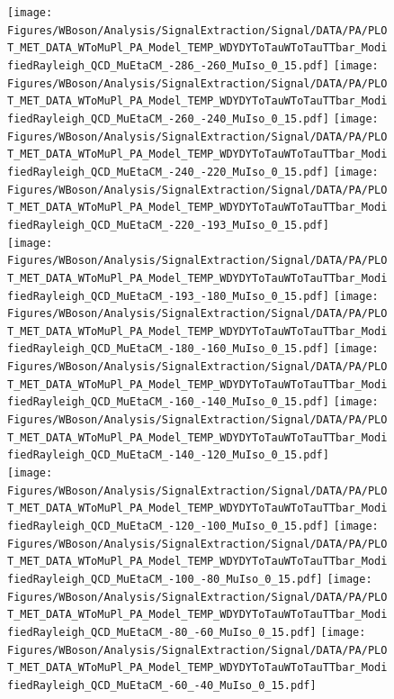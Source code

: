 \begin{figure}[!h]
\begin{center}
\begin{tiny}
\texttt{[image: Figures/WBoson/Analysis/SignalExtraction/Signal/DATA/PA/PLOT\_MET\_DATA\_WToMuPl\_PA\_Model\_TEMP\_WDYDYToTauWToTauTTbar\_ModifiedRayleigh\_QCD\_MuEtaCM\_-286\_-260\_MuIso\_0\_15.pdf]}
\texttt{[image: Figures/WBoson/Analysis/SignalExtraction/Signal/DATA/PA/PLOT\_MET\_DATA\_WToMuPl\_PA\_Model\_TEMP\_WDYDYToTauWToTauTTbar\_ModifiedRayleigh\_QCD\_MuEtaCM\_-260\_-240\_MuIso\_0\_15.pdf]}
\texttt{[image: Figures/WBoson/Analysis/SignalExtraction/Signal/DATA/PA/PLOT\_MET\_DATA\_WToMuPl\_PA\_Model\_TEMP\_WDYDYToTauWToTauTTbar\_ModifiedRayleigh\_QCD\_MuEtaCM\_-240\_-220\_MuIso\_0\_15.pdf]}
\texttt{[image: Figures/WBoson/Analysis/SignalExtraction/Signal/DATA/PA/PLOT\_MET\_DATA\_WToMuPl\_PA\_Model\_TEMP\_WDYDYToTauWToTauTTbar\_ModifiedRayleigh\_QCD\_MuEtaCM\_-220\_-193\_MuIso\_0\_15.pdf]}
\\
\texttt{[image: Figures/WBoson/Analysis/SignalExtraction/Signal/DATA/PA/PLOT\_MET\_DATA\_WToMuPl\_PA\_Model\_TEMP\_WDYDYToTauWToTauTTbar\_ModifiedRayleigh\_QCD\_MuEtaCM\_-193\_-180\_MuIso\_0\_15.pdf]}
\texttt{[image: Figures/WBoson/Analysis/SignalExtraction/Signal/DATA/PA/PLOT\_MET\_DATA\_WToMuPl\_PA\_Model\_TEMP\_WDYDYToTauWToTauTTbar\_ModifiedRayleigh\_QCD\_MuEtaCM\_-180\_-160\_MuIso\_0\_15.pdf]}
\texttt{[image: Figures/WBoson/Analysis/SignalExtraction/Signal/DATA/PA/PLOT\_MET\_DATA\_WToMuPl\_PA\_Model\_TEMP\_WDYDYToTauWToTauTTbar\_ModifiedRayleigh\_QCD\_MuEtaCM\_-160\_-140\_MuIso\_0\_15.pdf]}
\texttt{[image: Figures/WBoson/Analysis/SignalExtraction/Signal/DATA/PA/PLOT\_MET\_DATA\_WToMuPl\_PA\_Model\_TEMP\_WDYDYToTauWToTauTTbar\_ModifiedRayleigh\_QCD\_MuEtaCM\_-140\_-120\_MuIso\_0\_15.pdf]}
\\
\texttt{[image: Figures/WBoson/Analysis/SignalExtraction/Signal/DATA/PA/PLOT\_MET\_DATA\_WToMuPl\_PA\_Model\_TEMP\_WDYDYToTauWToTauTTbar\_ModifiedRayleigh\_QCD\_MuEtaCM\_-120\_-100\_MuIso\_0\_15.pdf]}
\texttt{[image: Figures/WBoson/Analysis/SignalExtraction/Signal/DATA/PA/PLOT\_MET\_DATA\_WToMuPl\_PA\_Model\_TEMP\_WDYDYToTauWToTauTTbar\_ModifiedRayleigh\_QCD\_MuEtaCM\_-100\_-80\_MuIso\_0\_15.pdf]}
\texttt{[image: Figures/WBoson/Analysis/SignalExtraction/Signal/DATA/PA/PLOT\_MET\_DATA\_WToMuPl\_PA\_Model\_TEMP\_WDYDYToTauWToTauTTbar\_ModifiedRayleigh\_QCD\_MuEtaCM\_-80\_-60\_MuIso\_0\_15.pdf]}
\texttt{[image: Figures/WBoson/Analysis/SignalExtraction/Signal/DATA/PA/PLOT\_MET\_DATA\_WToMuPl\_PA\_Model\_TEMP\_WDYDYToTauWToTauTTbar\_ModifiedRayleigh\_QCD\_MuEtaCM\_-60\_-40\_MuIso\_0\_15.pdf]}

\end{tiny}
\end{center}
\end{figure}
